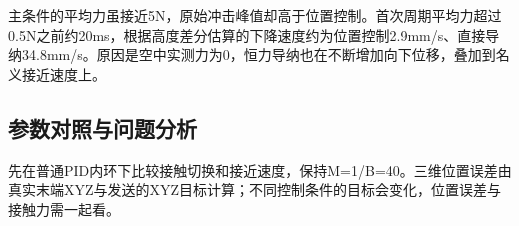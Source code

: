 


主条件的平均力虽接近5N，原始冲击峰值却高于位置控制。首次周期平均力超过0.5N之前约20ms，根据高度差分估算的下降速度约为位置控制2.9mm/s、直接导纳34.8mm/s。原因是空中实测力为0，恒力导纳也在不断增加向下位移，叠加到名义接近速度上。

\subsection{参数对照与问题分析}\label{s11-detail-4}

先在普通PID内环下比较接触切换和接近速度，保持M=1/B=40。三维位置误差由真实末端XYZ与发送的XYZ目标计算；不同控制条件的目标会变化，位置误差与接触力需一起看。

